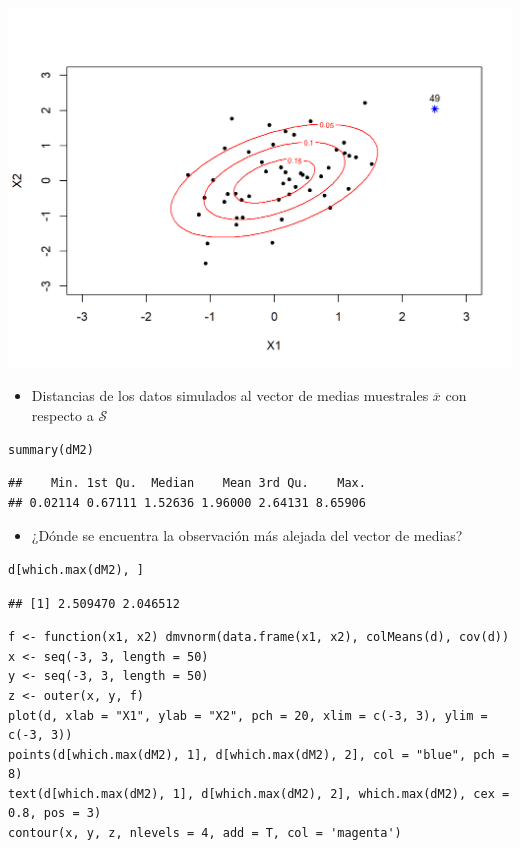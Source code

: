 \begin{center}
\includegraphics{"Temas/Imágenes/Tema 1/000014.png"}
\end{center}
\begin{itemize}[label=\color{red}\textbullet, leftmargin=*]
	\item \color{lightblue}Distancias de los datos simulados al vector de medias muestrales $\overline{x}$ con respecto a $\mathcal{S}$
\end{itemize}
\begin{lstlisting}
summary(dM2)
\end{lstlisting}

\begin{verbatim}
##    Min. 1st Qu.  Median    Mean 3rd Qu.    Max. 
## 0.02114 0.67111 1.52636 1.96000 2.64131 8.65906
\end{verbatim}

\begin{itemize}[label=\color{red}\textbullet, leftmargin=*]
	\item \color{lightblue}¿Dónde se encuentra la observación más alejada del vector de medias?
\end{itemize}

\begin{lstlisting}
d[which.max(dM2), ]
\end{lstlisting}

\begin{verbatim}
## [1] 2.509470 2.046512
\end{verbatim}

\begin{lstlisting}
f <- function(x1, x2) dmvnorm(data.frame(x1, x2), colMeans(d), cov(d))
x <- seq(-3, 3, length = 50)
y <- seq(-3, 3, length = 50)
z <- outer(x, y, f)
plot(d, xlab = "X1", ylab = "X2", pch = 20, xlim = c(-3, 3), ylim = c(-3, 3))
points(d[which.max(dM2), 1], d[which.max(dM2), 2], col = "blue", pch = 8)
text(d[which.max(dM2), 1], d[which.max(dM2), 2], which.max(dM2), cex = 0.8, pos = 3)
contour(x, y, z, nlevels = 4, add = T, col = 'magenta')
\end{lstlisting}

